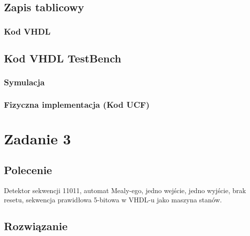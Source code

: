 \documentclass[a4paper,12pt]{extarticle}  %
\begin{document}
\subsection{Zapis tablicowy}
\subsubsection{Kod VHDL}

\subsection{Kod VHDL TestBench}

\subsubsection{Symulacja}
\begin{figure}[H]
	\centering
\end{figure}
\subsubsection{Fizyczna implementacja (Kod UCF)}


\section{Zadanie 3}
\subsection{Polecenie}
Detektor sekwencji 11011, automat Mealy-ego, jedno wejście, jedno wyjście, brak resetu, sekwencja prawidłowa 5-bitowa w VHDL-u jako maszyna stanów.
\subsection{Rozwiązanie}
\end{document}
